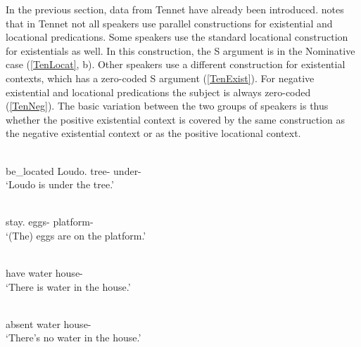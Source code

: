 In the previous section, data from Tennet have already been introduced.
\citet[236]{Randal:1998} notes that in Tennet not all speakers use parallel constructions for existential and locational predications.
Some speakers use the standard locational construction for existentials as well. 
In this construction, the S argument is in the Nominative case (\ref{TenLocat}, b).
Other speakers use a different construction for existential contexts, which has a zero-coded S argument (\ref{TenExist}). 
For negative existential and locational predications the subject is always zero-coded (\ref{TenNeg}).
The basic variation between the two groups of speakers is thus whether the positive existential context is covered by the same construction as the negative existential context or as the positive locational context. 

\begin{exe} \citep[Surmic; Sudan; ][223]{Randal:1998}\nopagebreak[4]
\begin{xlist}
\ex\label{TenLocat}\gll{} \textbf{}  \\
be\_located Loudo.\nom{} tree-\obl{} under-\obl{}\\
\glt `Loudo is under the tree.'

\ex\label{TenLocation}\gll{}  \\
stay.\pl{} eggs-\nom{} platform-\obl{}\\
\glt `(The) eggs are on the platform.' 
\end{xlist}
\end{exe}

\pagebreak

\begin{exe} \citep[236]{Randal:1998}\nopagebreak[4]
\begin{xlist}
\ex\label{TenExist}\gll{} \textbf{} \\
have water house-\obl{}\\
\glt `There is water in the house.' 

\ex\label{TenNeg}\gll{} \textbf{} \\
absent water house-\obl{}\\
\glt `There's no water in the house.' 
\end{xlist}
\end{exe}

